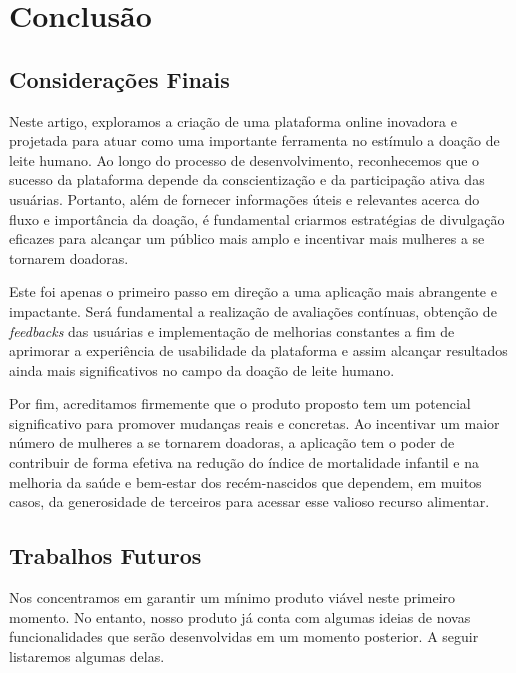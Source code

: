 \chapter{Conclusão}

\section{Considerações Finais}
Neste artigo, exploramos a criação de uma plataforma online inovadora e projetada para atuar como uma importante ferramenta no estímulo a doação de leite humano. 
Ao longo do processo de desenvolvimento, reconhecemos que o sucesso da plataforma depende da conscientização e da participação ativa das usuárias. Portanto, além de fornecer informações úteis e relevantes acerca do fluxo e importância da doação, é fundamental criarmos estratégias de divulgação eficazes para alcançar um público mais amplo e incentivar mais mulheres a se tornarem doadoras.

Este foi apenas o primeiro passo em direção a uma aplicação mais abrangente e impactante. Será fundamental a realização de avaliações contínuas, obtenção de \textit{feedbacks} das usuárias e implementação de melhorias constantes a fim de aprimorar a experiência de usabilidade da plataforma e assim alcançar resultados ainda mais significativos no campo da doação de leite humano.

Por fim, acreditamos firmemente que o produto proposto tem um potencial significativo para promover mudanças reais e concretas. Ao incentivar um maior número de mulheres a se tornarem doadoras, a aplicação tem o poder de contribuir de forma efetiva na redução do índice de mortalidade infantil e na melhoria da saúde e bem-estar dos recém-nascidos que dependem, em muitos casos, da generosidade de terceiros para acessar esse valioso recurso alimentar. 

\section{Trabalhos Futuros}
Nos concentramos em garantir um mínimo produto viável neste primeiro momento. No entanto, nosso produto já conta com algumas ideias de novas funcionalidades que serão desenvolvidas em um momento posterior. A seguir listaremos algumas delas.

